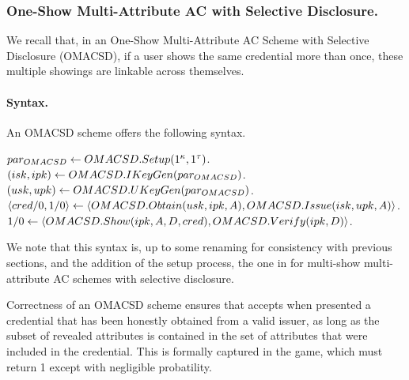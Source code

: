 \subsubsection{One-Show Multi-Attribute AC with Selective Disclosure.} %
We recall that, in an One-Show Multi-Attribute AC Scheme with Selective
Disclosure (OMACSD), if a user shows the same credential more than once, these
multiple showings are linkable across themselves. 

\paragraph{Syntax.} %
An OMACSD scheme offers the following syntax.

\begin{description}
\item[$par_{OMACSD} \leftarrow OMACSD.Setup(1^\kappa,1^\tau)$.]
\item[$(isk,ipk) \leftarrow OMACSD.IKeyGen(par_{OMACSD})$.]
\item[$(usk,upk) \leftarrow OMACSD.UKeyGen(par_{OMACSD})$.]
\item[$\langle cred/0, 1/0 \rangle \leftarrow
  \langle OMACSD.Obtain(usk,ipk,A),
  OMACSD.Issue(isk,upk,A) \rangle$.]
\item[$1/0 \leftarrow
  \langle OMACSD.Show(ipk,A,D,cred),
  OMACSD.Verify(ipk,D) \rangle$.]
\end{description}

We note that this syntax is, up to some renaming for consistency with previous
sections, and the addition of the setup process, the one in \cite{fhs19} for
multi-show multi-attribute AC schemes with selective disclosure.

Correctness of an OMACSD scheme ensures that \OMACSDVerify accepts when
presented a credential that has been honestly obtained from a valid issuer, as
long as the subset of revealed attributes \OMACSDdattr is contained in the set
of attributes \OMACSDattr that were included in the credential. This is formally
captured in the \OMACSDExpCorrect game, which must return 1 except with
negligible probatility.

